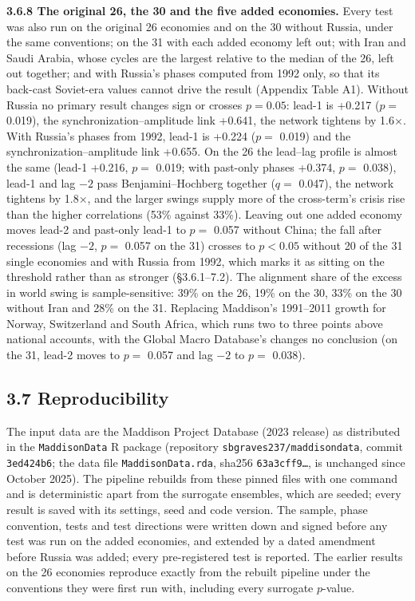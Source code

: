 \documentclass[11pt,a4paper]{article}
\begin{document}
\textbf{3.6.8 The original 26, the 30 and the five added economies.} Every test was also run on the original 26 economies and on the 30 without Russia, under the same conventions; on the 31 with each added economy left out; with Iran and Saudi Arabia, whose cycles are the largest relative to the median of the 26, left out together; and with Russia's phases computed from 1992 only, so that its back-cast Soviet-era values cannot drive the result (Appendix Table A1). Without Russia no primary result changes sign or crosses \(p = 0.05\): lead-1 is +0.217 (\(p =\) 0.019), the synchronization–amplitude link +0.641, the network tightens by 1.6×. With Russia's phases from 1992, lead-1 is +0.224 (\(p =\) 0.019) and the synchronization–amplitude link +0.655. On the 26 the lead–lag profile is almost the same (lead-1 +0.216, \(p =\) 0.019; with past-only phases +0.374, \(p =\) 0.038), lead-1 and lag \(-2\) pass Benjamini–Hochberg together (\(q =\) 0.047), the network tightens by 1.8×, and the larger swings supply more of the cross-term's crisis rise than the higher correlations (53\% against 33\%). Leaving out one added economy moves lead-2 and past-only lead-1 to \(p =\) 0.057 without China; the fall after recessions (lag \(-2\), \(p =\) 0.057 on the 31) crosses to \(p < 0.05\) without 20 of the 31 single economies and with Russia from 1992, which marks it as sitting on the threshold rather than as stronger (§3.6.1–7.2). The alignment share of the excess in world swing is sample-sensitive: 39\% on the 26, 19\% on the 30, 33\% on the 30 without Iran and 28\% on the 31. Replacing Maddison's 1991–2011 growth for Norway, Switzerland and South Africa, which runs two to three points above national accounts, with the Global Macro Database's changes no conclusion (on the 31, lead-2 moves to \(p =\) 0.057 and lag \(-2\) to \(p =\) 0.038).

\subsection{3.7 Reproducibility}\label{reproducibility}

The input data are the Maddison Project Database (2023 release) as distributed in the \texttt{MaddisonData} R package (repository \texttt{sbgraves237/maddisondata}, commit \texttt{3ed424b6}; the data file \texttt{MaddisonData.rda}, sha256 \texttt{63a3cff9…}, is unchanged since October 2025). The pipeline rebuilds from these pinned files with one command and is deterministic apart from the surrogate ensembles, which are seeded; every result is saved with its settings, seed and code version. The sample, phase convention, tests and test directions were written down and signed before any test was run on the added economies, and extended by a dated amendment before Russia was added; every pre-registered test is reported. The earlier results on the 26 economies reproduce exactly from the rebuilt pipeline under the conventions they were first run with, including every surrogate \(p\)-value.
\end{document}

